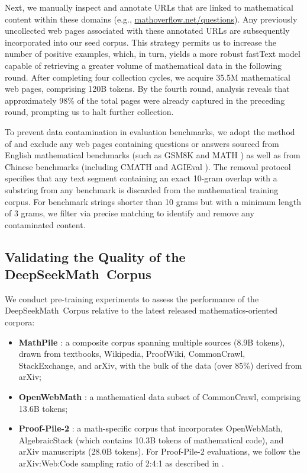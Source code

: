 Next, we manually inspect and annotate URLs that are linked to mathematical content within these domains (e.g., \url{mathoverflow.net/questions}). Any previously uncollected web pages associated with these annotated URLs are subsequently incorporated into our seed corpus. This strategy permits us to increase the number of positive examples, which, in turn, yields a more robust fastText model capable of retrieving a greater volume of mathematical data in the following round. After completing four collection cycles, we acquire 35.5M mathematical web pages, comprising 120B tokens. By the fourth round, analysis reveals that approximately 98\% of the total pages were already captured in the preceding round, prompting us to halt further collection.

To prevent data contamination in evaluation benchmarks, we adopt the method of \cite{deepseek-coder} and exclude any web pages containing questions or answers sourced from English mathematical benchmarks (such as GSM8K \citep{gsm8k} and MATH \citep{MATH}) as well as from Chinese benchmarks (including CMATH \citep{wei2023cmath} and AGIEval \citep{agieval}). The removal protocol specifies that any text segment containing an exact 10-gram overlap with a substring from any benchmark is discarded from the mathematical training corpus. For benchmark strings shorter than 10 grams but with a minimum length of 3 grams, we filter via precise matching to identify and remove any contaminated content.

\subsection{Validating the Quality of the DeepSeekMath~Corpus}

We conduct pre-training experiments to assess the performance of the DeepSeekMath~Corpus relative to the latest released mathematics-oriented corpora:

\begin{itemize}[topsep=0pt]
    \item \textbf{MathPile} \citep{mathpile}: a composite corpus spanning multiple sources (8.9B tokens), drawn from textbooks, Wikipedia, ProofWiki, CommonCrawl, StackExchange, and arXiv, with the bulk of the data (over 85\%) derived from arXiv;
    \item \textbf{OpenWebMath} \citep{openwebmath}: a mathematical data subset of CommonCrawl, comprising 13.6B tokens;
    \item \textbf{Proof-Pile-2} \citep{llemma}: a math-specific corpus that incorporates OpenWebMath, AlgebraicStack (which contains 10.3B tokens of mathematical code), and arXiv manuscripts (28.0B tokens). For Proof-Pile-2 evaluations, we follow the arXiv:Web:Code sampling ratio of 2:4:1 as described in \cite{llemma}.
\end{itemize}

